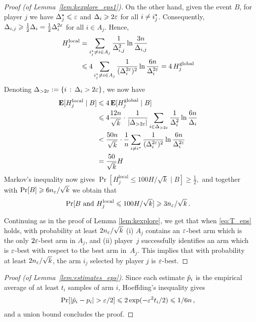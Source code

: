 \documentclass[12pt]{article}
\begin{document}
\begin{proof}[Proof (of Lemma~\ref{lem:kexplore_eps1})]
On the other hand, given the event $B$, for player $j$ we have $\Delta_j^\star \leqslant \varepsilon$ and $\Delta_i \geqslant 2\varepsilon$ for all $i \ne i_j^\star$.
Consequently, $\Delta_{i,j} \geqslant \tfrac{1}{2} \Delta_i =  \tfrac{1}{2} \Delta_i^{2\varepsilon}$ for all $i \in A_j$.
Hence,
\begin{align*}
	H_j^\text{local}
	&= \sum_{i^\star_j \ne i \in A_j} \frac{1}{\Delta_{i,j}^2} \ln \frac{3n}{\Delta_{i,j}} \\
	&\leqslant 4 \sum_{i^\star_j \ne i \in A_j} \frac{1}{(\Delta_i^{2\varepsilon})^2} \ln \frac{6n}{\Delta_i^{2\varepsilon}}
	= 4 \, H_j^\text{global}
\end{align*}
Denoting $\Delta_{> 2\varepsilon} := \{i \,:\, \Delta_i > 2\varepsilon\}$, we now have 
\begin{align*}
	\mathbf{E}[H_j^\text{local} \mid B]
	&\leqslant 4 \, \mathbf{E}[H_j^\text{global} \mid B] \\
	&\leqslant 4 \frac{12n}{\sqrt{k}} \cdot 
		\frac{1}{|\Delta_{>2\varepsilon}|} 
			\sum_{i \in \Delta_{>2\varepsilon}} \frac{1}{\Delta_i^2} \ln \frac{6n}{\Delta_i} \\
	&< \frac{50n}{\sqrt{k}} \cdot 
		\frac{1}{n} \sum_{i \ne i^\star} \frac{1}{(\Delta_i^{2\varepsilon})^2} \ln \frac{6n}{\Delta_i^{2\varepsilon}} \\
	&= \frac{50}{\sqrt{k}} H
\end{align*}
Markov's inequality now gives
$
	\Pr[H_j^\text{local} \le 100 H/\sqrt{k} \mid B]
	\ge \tfrac{1}{2} ,
$
and together with $\Pr[B] \geqslant 6 n_{\varepsilon} / \sqrt{k}$ we obtain that
\begin{align*}
	\Pr[B \mbox{ and } H_j^\text{local} \leqslant 100 H/\sqrt{k} ]
	\geqslant 3 n_{\varepsilon} / \sqrt{k} \,.
\end{align*}

Continuing as in the proof of Lemma \ref{lem:kexplore}, we get that when \eqref{eq:T_eps} holds, with probability at least $2 n_{\varepsilon} / \sqrt{k}$
(i) $A_j$ contains an $\varepsilon$-best arm which is the only $2\varepsilon$-best arm in $A_j$, and
(ii) player~$j$ successfully identifies an arm which is $\varepsilon$-best with respect to the best arm in~$A_j$. 
This implies that with probability at least $2 n_{\varepsilon} / \sqrt{k}$, the arm $i_j$ selected by player $j$ is $\varepsilon$-best.
\end{proof}



\begin{proof}[Proof (of Lemma~\ref{lem:estimates_eps})]
Since each estimate $\hat{p}_i$ is the empirical average of at least $t_i$ samples of arm $i$,
Hoeffding's inequality gives
\begin{align*}
	\Pr[|\hat{p}_i - p_i| > \varepsilon/2]
	\leqslant 2 \exp (-\varepsilon^2 t_i/2)
	\leqslant 1/6n \,,
\end{align*}
and a union bound concludes the proof.
\end{proof}
\end{document}

